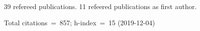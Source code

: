 39 refereed publications. 11 refeered publications as first author.

Total citations~=~857; h-index~=~15 (2019-12-04)